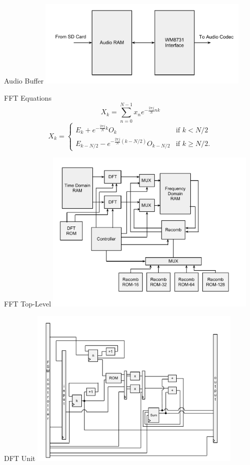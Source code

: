 \documentclass{beamer}
\begin{document}
\begin{frame}{Audio Buffer}
	\centering
	\includegraphics[width=4in]{audio-buffer}
\end{frame}

\begin{frame}{FFT Equations}
	\begin{equation}
		X_k = \sum_{n=0}^{N-1} x_n e^{-\frac{2\pi j}{N} nk}
	\end{equation}
	\begin{equation}
		X_k = \left\{
		\begin{matrix}
			E_k + e^{-\frac{2\pi j}{N}k} O_k		& 	\mbox{if } k < N/2 \\ 
			E_{k-N/2} - e^{-\frac{2\pi j}{N} (k-N/2)} O_{k-N/2} & 	\mbox{if }
			k \geq N/2. 
		\end{matrix} 
		\right.
	\end{equation}
\end{frame}

\begin{frame}{FFT Top-Level}
	\centering
	\includegraphics[width=4in]{fft-top}
\end{frame}

\begin{frame}{DFT Unit}
	\centering
	\includegraphics[width=4in]{dft-unit}
\end{frame}
\end{document}
